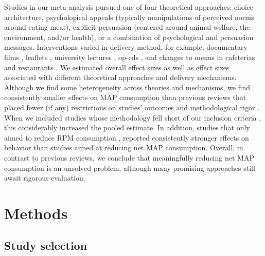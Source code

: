\documentclass[preprint, 3p,
authoryear]{elsarticle} %
\begin{document}
Studies in our meta-analysis pursued one of four theoretical approaches:
choice architecture, psychological appeals (typically manipulations of
perceived norms around eating meat), explicit persuasion (centered
around animal welfare, the environment, and/or health), or a combination
of psychological and persuasion messages. Interventions varied in
delivery method, for example, documentary films
\citep{mathur2021effectiveness}, leaflets \citep{peacock2017},
university lectures \citep{jalil2023}, op-eds \citep{haile2021}, and
changes to menus in cafeterias \citep{andersson2021} and restaurants
\citep{coker2022, sparkman2021}. We estimated overall effect sizes as
well as effect sizes associated with different theoretical approaches
and delivery mechanisms. Although we find some heterogeneity across
theories and mechanisms, we find consistently smaller effects on MAP
consumption than previous reviews that placed fewer (if any)
restrictions on studies' outcomes and methodological rigor
\citep{bianchi2018restructuring, byerly2018, chang2023, harguess2020, kwasny2022, mathur2021meta, meier2022}.
When we included studies whose methodology fell short of our inclusion
criteria
\citep{alblas2023, beresford2006, betterfoodfoundation2023, celis2017, dannenberg2023, delichatsios2001eatsmart, epperson2021, frie2022, garnett2020, griesoph2021, hansen2021, johansen2009, kaiser2020, lentz2020, loy2016, matthews2019, piazza2022, reinders2017, sparkman2017},
this considerably increased the pooled estimate. In addition, studies
that only aimed to reduce RPM consumption
\citep{anderson2017, carfora2017correlational, carfora2017randomised, carfora2019, carfora2019informational, delichatsios2001talking, dijkstra2022, emmons2005cancer, emmons2005project, jaacks2014, james2015, lee2018, lindstrom2015, perino2022, schatzkin2000, sorensen2005, wolstenholme2020},
reported consistently stronger effects on behavior than studies aimed at
reducing net MAP consumption. Overall, in contrast to previous reviews,
we conclude that meaningfully reducing net MAP consumption is an
unsolved problem, although many promising approaches still await
rigorous evaluation.

\section{Methods}\label{sec2}

\subsection{Study selection}\label{sec2.1}
\end{document}
